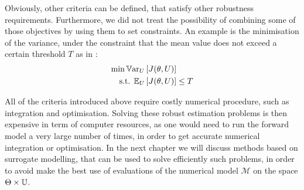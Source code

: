 \documentclass[../../Main_ManuscritThese.tex]{subfiles}
\begin{document}
Obviously, other criteria can be defined, that satisfy other
robustness requirements.  Furthermore, we did not treat the
possibility of combining some of those objectives by using them to set
constraints. An example is the minimisation of the variance, under the
constraint that the mean value does not exceed a certain threshold $T$
as in \cite{lehman_designing_2004}:
\begin{align*}
  \min \mathbb{V}\mathrm{ar}_{U}&\left[J(\theta, U)\right]  \\
  \text{s.t. } \mathbb{E}_{U}&\left[J(\theta, U)\right]   \leq T
\end{align*}

All of the criteria introduced above require costly numerical
procedure, such as integration and optimisation. Solving these robust
estimation problems is then expensive in term of computer resources,
as one would need to run the forward model a very large number of
times, in order to get accurate numerical integration or
optimisation. In the next chapter we will discuss methods based on
surrogate modelling, that can be used to solve efficiently such
problems, in order to avoid make the best use of evaluations of the
numerical model $\mathcal{M}$ on the space $\Theta \times\mathbb{U}$.

\markchapterend
\subfileLocal{
	\pagestyle{empty}
	
	
      }
\end{document}
